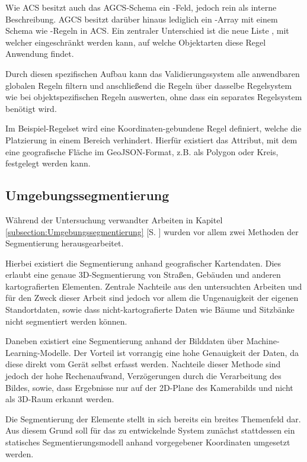 Wie ACS besitzt auch das AGCS-Schema ein -Feld, jedoch rein als interne Beschreibung. AGCS besitzt darüber hinaus lediglich ein -Array mit einem Schema wie -Regeln in ACS. Ein zentraler Unterschied ist die neue Liste , mit welcher eingeschränkt werden kann, auf welche Objektarten diese Regel Anwendung findet.

Durch diesen spezifischen Aufbau kann das Validierungssystem alle anwendbaren globalen Regeln filtern und anschließend die Regeln über dasselbe Regelsystem wie bei objektspezifischen Regeln auswerten, ohne dass ein separates Regelsystem benötigt wird.

Im Beispiel-Regelset wird eine Koordinaten-gebundene Regel definiert, welche die Platzierung in einem Bereich verhindert. Hierfür existiert das  Attribut, mit dem eine geografische Fläche im GeoJSON-Format, z.B. als Polygon oder Kreis, festgelegt werden kann.

\subsection{Umgebungssegmentierung}

Während der Untersuchung verwandter Arbeiten in Kapitel \ref{subsection:Umgebungssegmentierung} [S. \pageref{subsection:Umgebungssegmentierung}] wurden vor allem zwei Methoden der Segmentierung herausgearbeitet.

Hierbei existiert die Segmentierung anhand geografischer Kartendaten. Dies erlaubt eine genaue 3D-Segmentierung von Straßen, Gebäuden und anderen kartografierten Elementen. Zentrale Nachteile aus den untersuchten Arbeiten und für den Zweck dieser Arbeit sind jedoch vor allem die Ungenauigkeit der eigenen Standortdaten, sowie dass nicht-kartografierte Daten wie Bäume und Sitzbänke nicht segmentiert werden können.

Daneben existiert eine Segmentierung anhand der Bilddaten über Machine-Learning-Modelle. Der Vorteil ist vorrangig eine hohe Genauigkeit der Daten, da diese direkt vom Gerät selbst erfasst werden. Nachteile dieser Methode sind jedoch der hohe Rechenaufwand, Verzögerungen durch die Verarbeitung des Bildes, sowie, dass Ergebnisse nur auf der 2D-Plane des Kamerabilds und nicht als 3D-Raum erkannt werden.

\medskip

Die Segmentierung der Elemente stellt in sich bereits ein breites Themenfeld dar. Aus diesem Grund soll für das zu entwickelnde System zunächst stattdessen ein statisches Segmentierungsmodell anhand vorgegebener Koordinaten umgesetzt werden.

